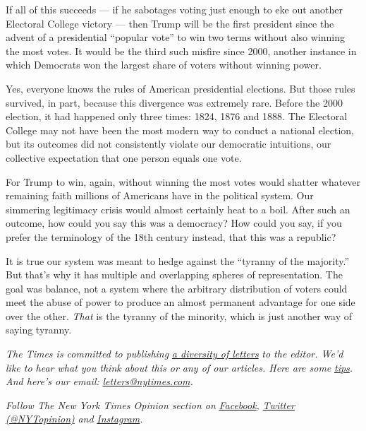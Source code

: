 If all of this succeeds --- if he sabotages voting just enough to eke
out another Electoral College victory --- then Trump will be the first
president since the advent of a presidential ``popular vote'' to win two
terms without also winning the most votes. It would be the third such
misfire since 2000, another instance in which Democrats won the largest
share of voters without winning power.

Yes, everyone knows the rules of American presidential elections. But
those rules survived, in part, because this divergence was extremely
rare. Before the 2000 election, it had happened only three times: 1824,
1876 and 1888. The Electoral College may not have been the most modern
way to conduct a national election, but its outcomes did not
consistently violate our democratic intuitions, our collective
expectation that one person equals one vote.

For Trump to win, again, without winning the most votes would shatter
whatever remaining faith millions of Americans have in the political
system. Our simmering legitimacy crisis would almost certainly heat to a
boil. After such an outcome, how could you say this was a democracy? How
could you say, if you prefer the terminology of the 18th century
instead, that this was a republic?

It is true our system was meant to hedge against the ``tyranny of the
majority.'' But that's why it has multiple and overlapping spheres of
representation. The goal was balance, not a system where the arbitrary
distribution of voters could meet the abuse of power to produce an
almost permanent advantage for one side over the other. \emph{That} is
the tyranny of the minority, which is just another way of saying
tyranny.

\emph{The Times is committed to publishing}
\href{https://www.nytimes.com/2019/01/31/opinion/letters/letters-to-editor-new-york-times-women.html}{\emph{a
diversity of letters}} \emph{to the editor. We'd like to hear what you
think about this or any of our articles. Here are some}
\href{https://help.nytimes.com/hc/en-us/articles/115014925288-How-to-submit-a-letter-to-the-editor}{\emph{tips}}\emph{.
And here's our email:}
\href{mailto:letters@nytimes.com}{\emph{letters@nytimes.com}}\emph{.}

\emph{Follow The New York Times Opinion section on}
\href{https://www.facebook.com/nytopinion}{\emph{Facebook}}\emph{,}
\href{http://twitter.com/NYTOpinion}{\emph{Twitter (@NYTopinion)}}
\emph{and}
\href{https://www.instagram.com/nytopinion/}{\emph{Instagram}}\emph{.}

